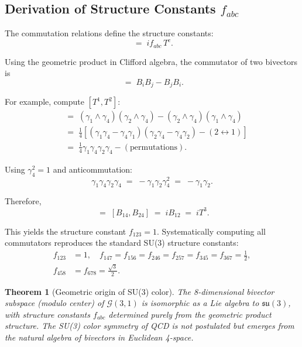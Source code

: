 \documentclass[11pt,a4paper]{article}
\newcommand{\Cl}{\mathcal{G}}
\theoremstyle{definition}
\theoremstyle{plain}
\newtheorem{theorem}{Theorem}[section]
\theoremstyle{remark}
\begin{document}
\subsection{Derivation of Structure Constants $f_{abc}$}

The commutation relations define the structure constants:
\begin{equation}
[T^a, T^b] \;=\; if_{abc}\,T^c.
\label{eq:commutator}
\end{equation}

Using the geometric product in Clifford algebra, the commutator of two bivectors is
\begin{equation}
[B_i, B_j] \;=\; B_i B_j - B_j B_i.
\end{equation}

For example, compute $[T^1, T^2]$:
\begin{align}
[B_{14}, B_{24}] &\;=\; (\gamma_1 \wedge \gamma_4)(\gamma_2 \wedge \gamma_4) - (\gamma_2 \wedge \gamma_4)(\gamma_1 \wedge \gamma_4) \nonumber \\
&\;=\; \frac{1}{4}[(\gamma_1\gamma_4 - \gamma_4\gamma_1)(\gamma_2\gamma_4 - \gamma_4\gamma_2) - (2 \leftrightarrow 1)] \nonumber \\
&\;=\; \frac{1}{4}\gamma_1\gamma_4\gamma_2\gamma_4 - (\text{permutations}).
\end{align}

Using $\gamma_4^2 = 1$ and anticommutation:
\begin{equation}
\gamma_1\gamma_4\gamma_2\gamma_4 \;=\; -\gamma_1\gamma_2\gamma_4^2 \;=\; -\gamma_1\gamma_2.
\end{equation}

Therefore,
\begin{equation}
[T^1, T^2] \;=\; [B_{14}, B_{24}] \;=\; i B_{12} \;=\; i T^3.
\end{equation}

This yields the structure constant $f_{123} = 1$. Systematically computing all commutators reproduces the standard SU(3) structure constants:
\begin{align}
f_{123} &= 1, \quad f_{147} = f_{156} = f_{246} = f_{257} = f_{345} = f_{367} = \frac{1}{2}, \nonumber \\
f_{458} &= f_{678} = \frac{\sqrt{3}}{2}.
\label{eq:structure-constants}
\end{align}

\begin{theorem}[Geometric origin of SU(3) color]
The 8-dimensional bivector subspace (modulo center) of $\Cl(3,1)$ is isomorphic as a Lie algebra to $\mathfrak{su}(3)$, with structure constants $f_{abc}$ determined purely from the geometric product structure. The SU(3) color symmetry of QCD is not postulated but emerges from the natural algebra of bivectors in Euclidean 4-space.
\end{theorem}
\end{document}
